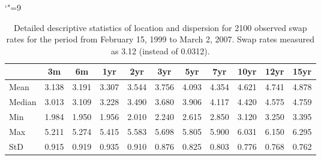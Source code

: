 \endgroup\catcode`"=9




\begin{table}[ht]
    \begin{center}
        {\footnotesize
        \begin{tabular}{l|cccccccccc}
        \hline \hline
                        & 3m    & 6m    & 1yr   & 2yr   & 3yr   & 5yr   & 7yr   & 10yr  & 12yr  & 15yr   \\
            \hline
                Mean   & 3.138 & 3.191 & 3.307 & 3.544 & 3.756 & 4.093 & 4.354 & 4.621 & 4.741 & 4.878  \\
                Median & 3.013 & 3.109 & 3.228 & 3.490 & 3.680 & 3.906 & 4.117 & 4.420 & 4.575 & 4.759  \\
                Min    & 1.984 & 1.950 & 1.956 & 2.010 & 2.240 & 2.615 & 2.850 & 3.120 & 3.250 & 3.395  \\
                Max    & 5.211 & 5.274 & 5.415 & 5.583 & 5.698 & 5.805 & 5.900 & 6.031 & 6.150 & 6.295  \\
                StD    & 0.915 & 0.919 & 0.935 & 0.910 & 0.876 & 0.825 & 0.803 & 0.776 & 0.768 & 0.762  \\
            \hline \hline
        \end{tabular}}
    \end{center}
    \caption{Detailed descriptive statistics of location and dispersion for
    2100 observed swap rates for the period from
    February 15, 1999 to March 2, 2007. Swap rates measured as 3.12 (instead of 0.0312).}
    \label{Tab:DescripStatsRawDataDetail}
\end{table}
